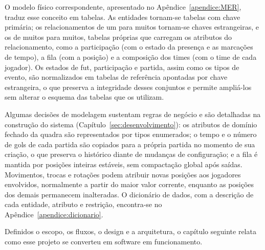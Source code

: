       O modelo físico correspondente, apresentado no Apêndice~\ref{apendice:MER}, traduz esse conceito em tabelas. As entidades tornam-se tabelas com chave primária; os relacionamentos de um para muitos tornam-se chaves estrangeiras, e os de muitos para muitos, tabelas próprias que carregam os atributos do relacionamento, como a participação (com o estado da presença e as marcações de tempo), a fila (com a posição) e a composição dos times (com o time de cada jogador). Os estados de fut, participação e partida, assim como os tipos de evento, são normalizados em tabelas de referência apontadas por chave estrangeira, o que preserva a integridade desses conjuntos e permite ampliá-los sem alterar o esquema das tabelas que os utilizam.

      Algumas decisões de modelagem sustentam regras de negócio e são detalhadas na construção do sistema (Capítulo~\ref{sec:desenvolvimento}): os atributos de domínio fechado da quadra são representados por tipos enumerados; o tempo e o número de gols de cada partida são copiados para a própria partida no momento de sua criação, o que preserva o histórico diante de mudanças de configuração; e a fila é mantida por posições inteiras estáveis, sem compactação global após saídas. Movimentos, trocas e rotações podem atribuir novas posições aos jogadores envolvidos, normalmente a partir do maior valor corrente, enquanto as posições dos demais permanecem inalteradas. O dicionário de dados, com a descrição de cada entidade, atributo e restrição, encontra-se no Apêndice~\ref{apendice:dicionario}.

      Definidos o escopo, os fluxos, o design e a arquitetura, o capítulo seguinte relata como esse projeto se converteu em software em funcionamento.

    




